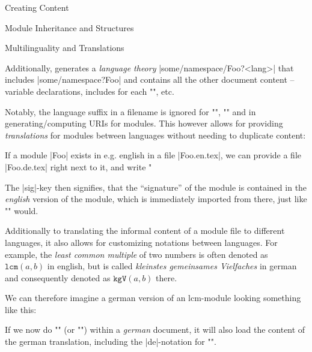 \begin{sfragment}{Creating \sTeX Content}
\begin{sfragment}{Module Inheritance and Structures}
\begin{sfragment}{Multilinguality and Translations}
\begin{mmtbox}
        Additionally, \mmt generates a \emph{language theory} 
        |some/namespace/Foo?<lang>| that includes |some/namespace?Foo|
        and contains all the other document content -- variable
        declarations, includes for each \stexcode"\usemodule", etc.
      \end{mmtbox}

      Notably, the language suffix in a filename is ignored
      for \stexcode"\usemodule", \stexcode"\importmodule"
      and in generating/computing URIs for modules. This however
      allows for providing \emph{translations} for modules
      between languages without needing to duplicate content:

      If a module |Foo| exists in e.g. english in a file |Foo.en.tex|,
      we can provide a file |Foo.de.tex| right next to it, and write
      \stexcode"\fi
      The |sig|-key then signifies, that the ``signature'' of the
      module is contained in the \emph{english} version of the module,
      which is immediately imported from there, just like
      \stexcode"\importmodule" would.

      Additionally to translating the informal content of a module
      file to different languages, it also allows for customizing
      notations between languages. For example,
      the \emph{least common multiple} of two numbers is often
      denoted as $\mathtt{lcm}(a,b)$ in english, but is
      called \emph{kleinstes gemeinsames Vielfaches} in german
      and consequently denoted as $\mathtt{kgV}(a,b)$ there.

      We can therefore imagine a german version of an lcm-module
      looking something like this:

      \begin{latexcode}[gobble=8]
      \end{latexcode}

      If we now do \stexcode""
      (or \stexcode"") within a \emph{german} document,
      it will also load the content of the german translation,
      including the |de|-notation for \stexcode"\lcm".


\end{sfragment}
\end{sfragment}
\end{sfragment}
